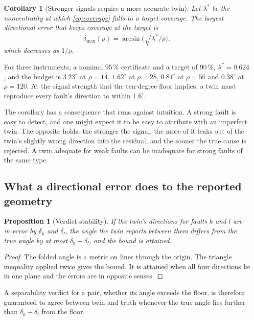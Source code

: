 \documentclass[preprint,12pt]{elsarticle}
\newtheorem{corollary}{Corollary}
\newtheorem{proposition}[theorem]{Proposition}
\begin{document}
\begin{corollary}[Stronger signals require a more accurate twin]
\label{cor:budget}
Let $\lambda^*$ be the noncentrality at which \eqref{eq:coverage} falls to a
target coverage. The largest directional error that keeps coverage at the
target is
\begin{equation}
\delta_{\max}(\rho) = \arcsin\bigl(\sqrt{\lambda^*}/\rho\bigr),
\label{eq:budget}
\end{equation}
which decreases as $1/\rho$.
\end{corollary}

For three instruments, a nominal 95\,\% certificate and a target of 90\,\%,
$\lambda^* = 0.624$, and the budget is $3.23^\circ$ at $\rho = 14$,
$1.62^\circ$ at $\rho = 28$, $0.81^\circ$ at $\rho = 56$ and $0.38^\circ$ at
$\rho = 120$. At the signal strength that the ten-degree floor implies, a twin
must reproduce every fault's direction to within $1.6^\circ$.

The corollary has a consequence that runs against intuition. A strong fault is
easy to detect, and one might expect it to be easy to attribute with an
imperfect twin. The opposite holds: the stronger the signal, the more of it
leaks out of the twin's slightly wrong direction into the residual, and the
sooner the true cause is rejected. A twin adequate for weak faults can be
inadequate for strong faults of the same type.

\subsection{What a directional error does to the reported geometry}

\begin{proposition}[Verdict stability]
\label{prop:verdict}
If the twin's directions for faults $k$ and $l$ are in error by $\delta_k$ and
$\delta_l$, the angle the twin reports between them differs from the true angle
by at most $\delta_k + \delta_l$, and the bound is attained.
\end{proposition}

\begin{proof}
The folded angle is a metric on lines through the origin. The triangle
inequality applied twice gives the bound. It is attained when all four
directions lie in one plane and the errors are in opposite senses.
\end{proof}

A separability verdict for a pair, whether its angle exceeds the floor, is
therefore guaranteed to agree between twin and truth whenever the true angle
lies further than $\delta_k + \delta_l$ from the floor.
\end{document}
